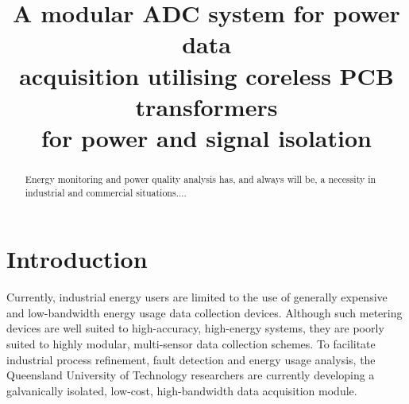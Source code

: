 \documentclass[conference]{IEEEtran}
\begin{document}
%
\title{A modular ADC system for power data \\acquisition utilising coreless PCB transformers \\for power and signal isolation}


\author{
}





\maketitle

\begin{abstract}
Energy monitoring and power quality analysis has, and always will be, a necessity in industrial and commercial situations....
\end{abstract}


\IEEEpeerreviewmaketitle

\section{Introduction}

Currently, industrial energy users are limited to the use of generally expensive and low-bandwidth energy usage data collection devices. Although such metering devices are well suited to high-accuracy, high-energy systems, they are poorly suited to highly modular, multi-sensor data collection schemes.  To facilitate industrial process refinement, fault detection and energy usage analysis, the Queensland University of Technology researchers are currently developing a galvanically isolated, low-cost, high-bandwidth data acquisition module. 
\end{document}

